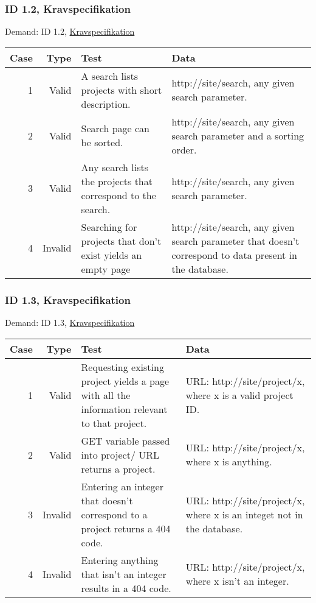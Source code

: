 \documentclass{TDP003mall}
\begin{document}
\subsubsection{ID 1.2, Kravspecifikation}
Demand: ID 1.2, \href{https://www.ida.liu.se/~TDP003/current/projekt/dokument/systemspecifikation.pdf}{Kravspecifikation}
\begin{table}[!h]
\begin{tabularx}{\linewidth}{|r|r|X|X|}\hline
\textbf{Case} &\textbf{Type} & \textbf{Test} & \textbf{Data} \\\hline
1 &Valid & A search lists projects with short description. & http://site/search, any given search parameter. \\\hline
2 &Valid & Search page can be sorted.  & http://site/search, any given search parameter and a sorting order. \\\hline
3 &Valid & Any search lists the projects that correspond to the search.  & http://site/search, any given search parameter. \\\hline
4 &Invalid & Searching for projects that don't exist yields an empty page & http://site/search, any given search parameter that doesn't correspond to data
present in the database. \\\hline
\end{tabularx}
\end{table}


\newpage
\subsubsection{ID 1.3, Kravspecifikation}
Demand: ID 1.3, \href{https://www.ida.liu.se/~TDP003/current/projekt/dokument/systemspecifikation.pdf}{Kravspecifikation}
\begin{table}[!h]
\begin{tabularx}{\linewidth}{|r|r|X|X|}\hline
\textbf{Case} &\textbf{Type} & \textbf{Test} & \textbf{Data} \\\hline
1 &Valid & Requesting existing project yields a page with all the information relevant to that project. & URL: http://site/project/x, where x is a valid project ID. \\\hline
2 &Valid & GET variable passed into  project/ URL returns a project.  & URL: http://site/project/x,
where x is anything.\\\hline
3 &Invalid & Entering an integer that doesn't correspond to a project returns a 404 code.  & URL: http://site/project/x, where x is an integet not in the database. \\\hline
4 &Invalid & Entering anything that isn't an integer results in a 404 code. & URL: http://site/project/x, where x isn't an integer. \\\hline
\end{tabularx}
\end{table}
\end{document}
